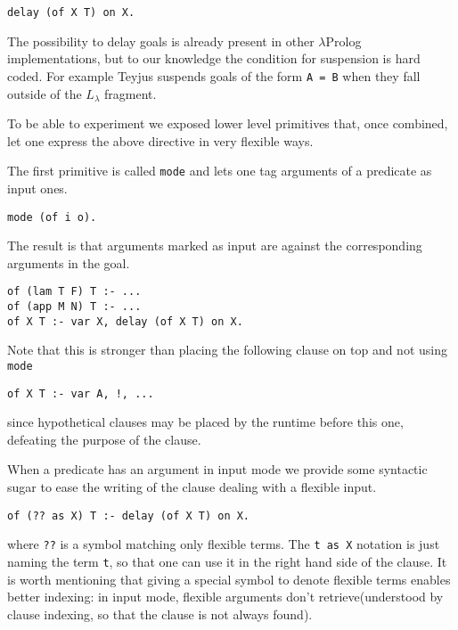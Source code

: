 \documentclass{easychair}
\begin{document}
\begin{verbatim}
delay (of X T) on X.
\end{verbatim}

The possibility to delay goals is already present in other $\lambda$Prolog
implementations, but to our knowledge the condition for suspension is
hard coded. For example Teyjus suspends goals of the form \verb+A = B+
when they fall outside of the $L_\lambda$ fragment.

To be able to experiment we exposed lower level primitives that, once
combined, let one express the above directive in very flexible ways.

The first primitive is called \verb+mode+ and lets one tag arguments of
a predicate as input ones.

\begin{verbatim}
mode (of i o).
\end{verbatim}

The result is that arguments marked as input are 
against the corresponding arguments in the goal.  

\begin{verbatim}
of (lam T F) T :- ...
of (app M N) T :- ...
of X T :- var X, delay (of X T) on X.
\end{verbatim}

Note that this is stronger than placing the following clause on top
and not using \verb+mode+

\begin{verbatim}
of X T :- var A, !, ...
\end{verbatim}

since hypothetical clauses may be placed by the runtime before this one,
defeating the purpose of the clause.

When a predicate has an argument in input mode we provide some syntactic sugar
to ease the writing of the clause dealing with a flexible input.

\begin{verbatim}
of (?? as X) T :- delay (of X T) on X.
\end{verbatim}

where \verb+??+ is a symbol matching only flexible terms.
The \verb+t as X+ notation
is just naming the term \verb+t+, so that one can use it in the right hand
side of the clause.
It is worth mentioning that giving a special symbol to denote
flexible terms enables better indexing: in input mode, flexible arguments don't retrieve(understood by clause indexing, so that the clause is not always found).  
\end{document}
